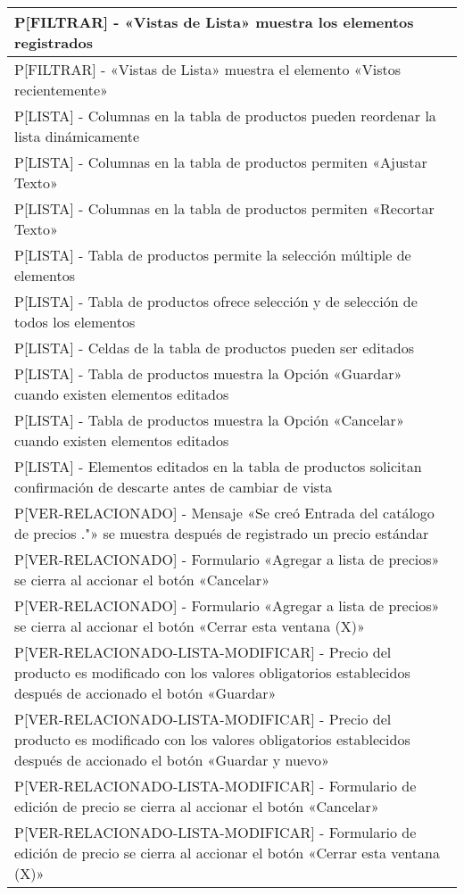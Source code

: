 \begin{longtable}{|p{15.0cm}|}
P[FILTRAR] - «Vistas de Lista» muestra los elementos registrados \\ \hline
P[FILTRAR] - «Vistas de Lista» muestra el elemento «Vistos recientemente» \\ \hline
P[LISTA] - Columnas en la tabla de productos pueden reordenar la lista dinámicamente \\ \hline
P[LISTA] - Columnas en la tabla de productos permiten «Ajustar Texto» \\ \hline
P[LISTA] - Columnas en la tabla de productos permiten «Recortar Texto» \\ \hline
P[LISTA] - Tabla de productos permite la selección múltiple de elementos \\ \hline
P[LISTA] - Tabla de productos ofrece selección y de selección de todos los elementos \\ \hline
P[LISTA] - Celdas de la tabla de productos pueden ser editados \\ \hline
P[LISTA] - Tabla de productos muestra la Opción «Guardar» cuando existen elementos editados \\ \hline
P[LISTA] - Tabla de productos muestra la Opción «Cancelar» cuando existen elementos editados \\ \hline
P[LISTA] - Elementos editados en la tabla de productos solicitan confirmación de descarte antes de cambiar de vista \\ \hline
P[VER-RELACIONADO] - Mensaje «Se creó Entrada del catálogo de precios ."» se muestra después de registrado un precio estándar \\ \hline
P[VER-RELACIONADO] - Formulario «Agregar a lista de precios» se cierra al accionar el botón «Cancelar» \\ \hline
P[VER-RELACIONADO] - Formulario «Agregar a lista de precios» se cierra al accionar el botón «Cerrar esta ventana (X)» \\ \hline
P[VER-RELACIONADO-LISTA-MODIFICAR] - Precio del producto es modificado con los valores obligatorios establecidos después de accionado el botón «Guardar» \\ \hline
P[VER-RELACIONADO-LISTA-MODIFICAR] - Precio del producto es modificado con los valores obligatorios establecidos después de accionado el botón «Guardar y nuevo» \\ \hline
P[VER-RELACIONADO-LISTA-MODIFICAR] - Formulario de edición de precio se cierra al accionar el botón «Cancelar» \\ \hline
P[VER-RELACIONADO-LISTA-MODIFICAR] - Formulario de edición de precio se cierra al accionar el botón «Cerrar esta ventana (X)» \\ \hline

\end{longtable}
